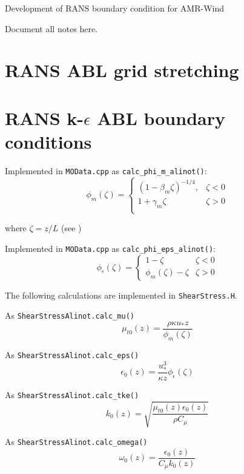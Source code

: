 \documentclass{article}
\begin{document}
\begin{center}
{\Large{}Development of RANS boundary condition for
  AMR-Wind}{\Large\par} \par\end{center}

Document all notes here.

\section{RANS ABL grid stretching}

\section{RANS k-$\epsilon$ ABL boundary conditions}

Implemented in \texttt{MOData.cpp} as \texttt{calc\_phi\_m\_alinot()}: 
\begin{equation}
\phi_m\left(\zeta \right) =
\begin{cases}
\left( 1 - \beta_m \zeta \right)^{-1/4}, & \zeta < 0\\
1+ \gamma_m \zeta                       & \zeta > 0\\
\end{cases}
\end{equation}

where $\zeta=z/L$ (see \cite{alinot2005k})

Implemented in \texttt{MOData.cpp} as \texttt{calc\_phi\_eps\_alinot()}: 
\begin{equation}
  \phi_\epsilon\left( \zeta \right) =
  \begin{cases}
    1-\zeta                            & \zeta < 0\\
    \phi_m\left( \zeta \right) - \zeta & \zeta > 0
  \end{cases}
  \end{equation}

The following calculations are implemented in \texttt{ShearStress.H}.

As \texttt{ShearStressAlinot.calc\_mu()}
\begin{equation}
  \mu_{t0}(z) = \frac{\rho \kappa u_* z}{\phi_m(\zeta)}
\end{equation}

As \texttt{ShearStressAlinot.calc\_eps()}
\begin{equation}
  \epsilon_0(z) = \frac{u_*^3}{\kappa z} \phi_\epsilon(\zeta)
\end{equation}

As \texttt{ShearStressAlinot.calc\_tke()}
\begin{equation}
  k_0(z) = \sqrt{\frac{\mu_{t0}(z)\epsilon_0(z)}{\rho C_\mu}}
\end{equation}

As \texttt{ShearStressAlinot.calc\_omega()}
\begin{equation}
  \omega_0(z) = \frac{\epsilon_0(z)}{C_\mu k_0(z)}
\end{equation}



\end{document}
